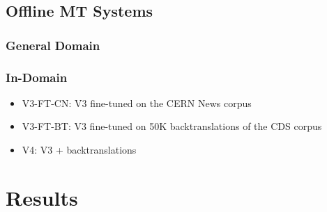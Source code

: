 \documentclass[landscape]{article}
\begin{document}
\subsection*{Offline MT Systems}
\vspace*{5mm}
\subsubsection*{General Domain}
\vspace*{5mm}
\begin{table}[!htp]
\centering
{}
\end{table}
\vspace*{-10mm}
\subsubsection*{In-Domain}
\begin{itemize}
	\item V3-FT-CN: V3 fine-tuned on the CERN News corpus
	\item V3-FT-BT: V3 fine-tuned on 50K backtranslations of the CDS corpus
	\item V4: V3 + backtranslations
\end{itemize}


\cp
\section*{Results}
\vspace*{10mm}
\end{document}
